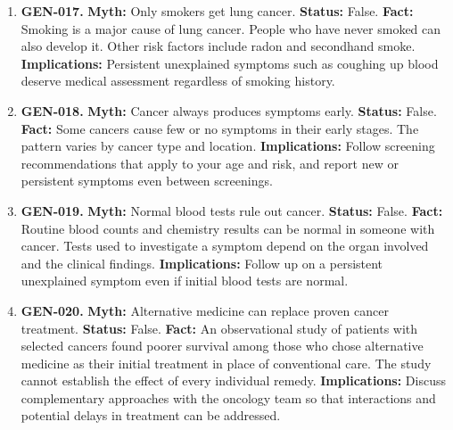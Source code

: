 \documentclass[11pt,oneside]{book}
\begin{document}
\begin{enumerate}[leftmargin=0pt,labelwidth=0pt,labelsep=0pt,itemindent=0pt]
\textbf{Implications:} During treatment, seek dietary advice if eating is difficult or you are losing weight unintentionally.
\item[] \textbf{GEN-017.} \textbf{Myth:} Only smokers get lung cancer.\newline
\textbf{Status:} False.\newline
\textbf{Fact:} Smoking is a major cause of lung cancer. People who have never smoked can also develop it. Other risk factors include radon and secondhand smoke. \cite{ref309}\newline
\textbf{Implications:} Persistent unexplained symptoms such as coughing up blood deserve medical assessment regardless of smoking history.
\item[] \textbf{GEN-018.} \textbf{Myth:} Cancer always produces symptoms early.\newline
\textbf{Status:} False.\newline
\textbf{Fact:} Some cancers cause few or no symptoms in their early stages. The pattern varies by cancer type and location. \cite{ref16}\newline
\textbf{Implications:} Follow screening recommendations that apply to your age and risk, and report new or persistent symptoms even between screenings.
\item[] \textbf{GEN-019.} \textbf{Myth:} Normal blood tests rule out cancer.\newline
\textbf{Status:} False.\newline
\textbf{Fact:} Routine blood counts and chemistry results can be normal in someone with cancer. Tests used to investigate a symptom depend on the organ involved and the clinical findings. \cite{ref310}\newline
\textbf{Implications:} Follow up on a persistent unexplained symptom even if initial blood tests are normal.
\item[] \textbf{GEN-020.} \textbf{Myth:} Alternative medicine can replace proven cancer treatment.\newline
\textbf{Status:} False.\newline
\textbf{Fact:} An observational study of patients with selected cancers found poorer survival among those who chose alternative medicine as their initial treatment in place of conventional care. The study cannot establish the effect of every individual remedy. \cite{ref243}\newline
\textbf{Implications:} Discuss complementary approaches with the oncology team so that interactions and potential delays in treatment can be addressed.

\end{enumerate}
\end{document}
